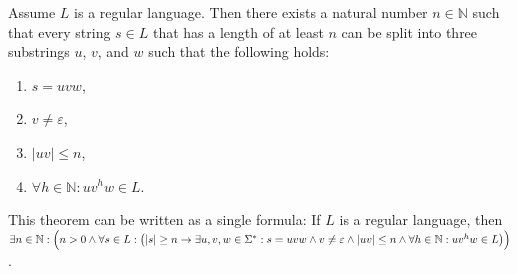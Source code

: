 \begin{Theorem} \lb
   
  Assume $L$ is a regular language.  Then there exists a natural number $n \in \mathbb{N}$ such that
  every string $s \in L$ that has a length of at least $n$ can be split into three substrings $u$,
  $v$, and $w$ such that the following holds:
  \begin{enumerate}
  \item $s= uvw$,
  \item $v \not= \varepsilon$,
  \item $|uv| \leq n$,
  \item $\forall h \in \mathbb{N}: uv^hw \in L$.
  \end{enumerate}
  This theorem can be written as a single formula:  If $L$ is a regular language, then 
  \\[0.2cm]
  \hspace*{0.3cm}
  $\exists n \in \mathbb{N}:\Bigl(n > 0 \wedge \forall s \in L : \bigl(|s| \geq n \rightarrow \exists u,v,w\in \Sigma^* :
   s = uvw \wedge v \not= \varepsilon \wedge |uv| \leq n \wedge 
    \forall h \in \mathbb{N}: uv^h w \in L
   \bigr)\Bigr)
  $.
\end{Theorem}

